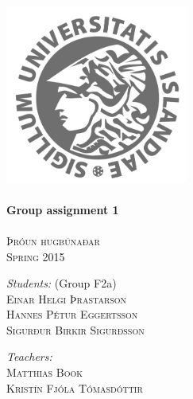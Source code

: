 \documentclass{article}
\begin{document}
\begin{titlepage}
\begin{center}

\textsc{}\\[2cm] 

\includegraphics[width=6cm]{Haskoli_Islands_rett.jpg}\\[0.5cm]

\HRule \\[0.6cm]
{ \huge \bfseries Group assignment 1}\\[0.2cm]
\HRule \\[0.4cm]

\textsc{\normalsize Þróun hugbúnaðar} \\
\textsc{Spring 2015} \\[1.5cm]

\begin{minipage}{0.45\textwidth}
\begin{flushleft} \large
\textit{Students:} (Group F2a)\\
\textsc{Einar Helgi Þrastarson} \\
\textsc{Hannes Pétur Eggertsson} \\
\textsc{Sigurður Birkir Sigurðsson} \\
\end{flushleft}
\end{minipage}
\begin{minipage}{0.45\textwidth}
\begin{flushright} \large
\textit{Teachers:} \\
\textsc{Matthias Book}\\
\textsc{Kristín Fjóla Tómasdóttir}\\
\textsc{ }\\
\end{flushright}
\end{minipage}

\end{center}
\end{titlepage}
\end{document}
